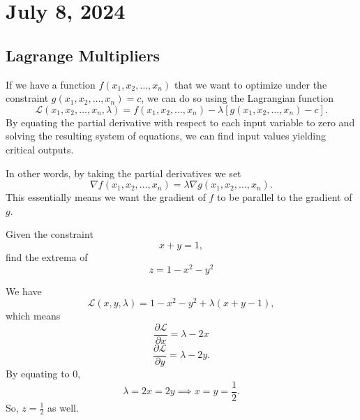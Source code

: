 \chapter{July 8, 2024}

\section{Lagrange Multipliers}

If we have a function $f(x_{1}, x_{2}, \dots, x_{n})$ that we want to optimize under the constraint $g(x_{1}, x_{2}, \dots, x_{n}) = c$, we can do so using the Lagrangian function
\[\mathcal{L}(x_{1}, x_{2}, \dots, x_{n}, \lambda) = f(x_{1}, x_{2}, \dots, x_{n}) - \lambda[g(x_{1}, x_{2}, \dots, x_{n}) - c].\]
By equating the partial derivative with respect to each input variable to zero and solving the resulting system of equations, we can find input values yielding critical outputs.

\begin{remark}
    In other words, by taking the partial derivatives we set
    \[\nabla f(x_{1}, x_{2}, \dots, x_{n}) = \lambda\nabla g(x_{1}, x_{2}, \dots, x_{n}).\]
    This essentially means we want the gradient of $f$ to be parallel to the gradient of $g$.
\end{remark}

\begin{example}
    Given the constraint
    \[x + y = 1,\]
    find the extrema of
    \[z = 1 - x^{2} - y^{2}\]
    \begin{soln}
        We have
        \[\mathcal{L}(x, y, \lambda) = 1 - x^{2} - y^{2} + \lambda(x + y - 1),\]
        which means
        \[\frac{\partial \mathcal{L}}{\partial x} = \lambda - 2x\]
        \[\frac{\partial \mathcal{L}}{\partial y} = \lambda - 2y.\]
        By equating to 0,
        \[\lambda = 2x = 2y \implies x = y = \frac{1}{2}.\]
        So, $z = \frac{1}{2}$ as well.
    \end{soln}
\end{example}